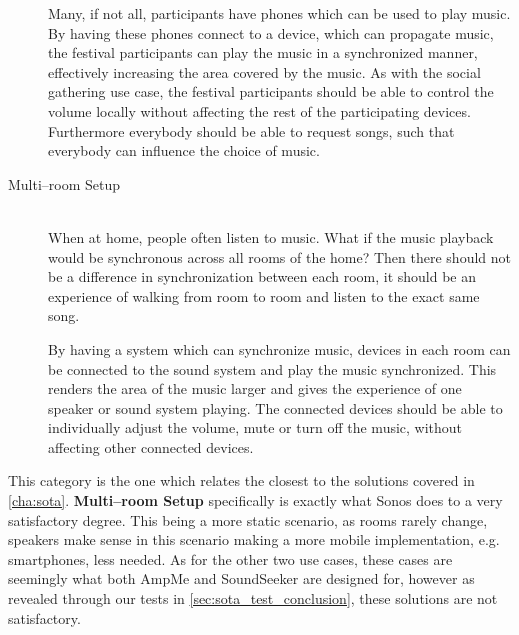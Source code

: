 \begin{description}
        Many, if not all, participants have phones which can be used to play music.
        By having these phones connect to a device, which can propagate music,
        the festival participants can play the music in a synchronized manner,
        effectively increasing the area covered by the music.
        As with the social gathering use case,
        the festival participants should be able to control the volume locally without affecting the rest of the participating devices.
        Furthermore everybody should be able to request songs, such that everybody can influence the choice of music.

    \item[Multi--room Setup] \hfill\\
        When at home, people often listen to music.
        What if the music playback would be synchronous across all rooms of the home?
        Then there should not be a difference in synchronization between each room,
        it should be an experience of walking from room to room and listen to the exact same song.

        By having a system which can synchronize music, devices in each room can be connected to the sound system and play the music synchronized.
        This renders the area of the music larger and gives the experience of one speaker or sound system playing.
        The connected devices should be able to individually adjust the volume, mute or turn off the music,
        without affecting other connected devices.
\end{description}

This category is the one which relates the closest to the solutions covered in \cref{cha:sota}.
\textbf{Multi--room Setup} specifically is exactly what Sonos does to a very satisfactory degree.
This being a more static scenario, as rooms rarely change, speakers make sense in this scenario making a more mobile implementation, e.g. smartphones, less needed.
As for the other two use cases, these cases are seemingly what both AmpMe and SoundSeeker are designed for, however as revealed through our tests in \cref{sec:sota_test_conclusion}, these solutions are not satisfactory.
